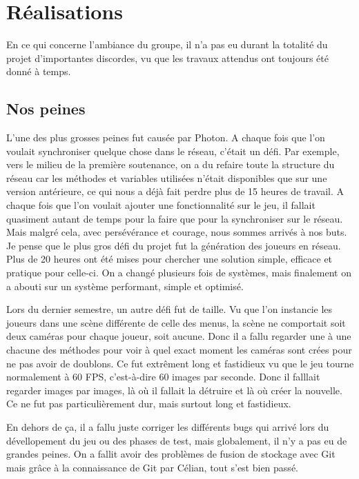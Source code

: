 \documentclass{article}
\begin{document}

\newpage
\section{Réalisations}
En ce qui concerne l'ambiance du groupe, il n'a pas eu durant la totalité du projet d'importantes discordes, vu que les travaux attendus ont toujours été donné à temps.

\subsection{Nos peines}
L'une des plus grosses peines fut causée par Photon. A chaque fois que l'on voulait synchroniser quelque chose dans le réseau, c'était un défi. Par exemple, vers le milieu de la première soutenance, on a du refaire toute la structure du réseau car les méthodes et variables utilisées n'était disponibles que sur une version antérieure, ce qui nous a déjà fait perdre plus de 15 heures de travail. A chaque fois que l'on voulait ajouter une fonctionnalité sur le jeu, il fallait quasiment autant de temps pour la faire que pour la synchroniser sur le réseau. Mais malgré cela, avec persévérance et courage, nous sommes arrivés à nos buts. Je pense que le plus gros défi du projet fut la génération des joueurs en réseau. Plus de 20 heures ont été mises pour chercher une solution simple, efficace et pratique pour celle-ci. On a changé plusieurs fois de systèmes, mais finalement on a abouti sur un système performant, simple et optimisé. 

Lors du dernier semestre, un autre défi fut de taille. Vu que l'on instancie les joueurs dans une scène différente de celle des menus, la scène ne comportait soit deux caméras pour chaque joueur, soit aucune. Donc il a fallu regarder une à une chacune des méthodes pour voir à quel exact moment les caméras sont crées pour ne pas avoir de doublons. Ce fut extrêment long et fastidieux vu que le jeu tourne normalement à 60 FPS, c'est-à-dire 60 images par seconde. Donc il falllait regarder images par images, là où il fallait la détruire et là où créer la nouvelle. Ce ne fut pas particulièrement dur, mais surtout long et fastidieux.

En dehors de ça, il a fallu juste corriger les différents bugs qui arrivé lors du dévellopement du jeu ou des phases de test, mais globalement, il n'y a pas eu de grandes peines. On a fallit avoir des problèmes de fusion de stockage avec Git mais grâce à la connaissance de Git par Célian, tout s'est bien passé.
\end{document}
